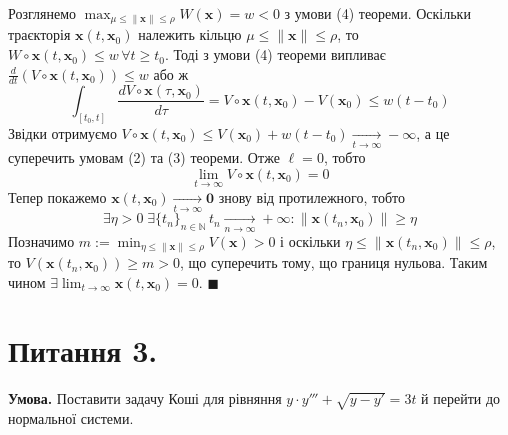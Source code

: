 \documentclass[14pt]{extarticle}
\begin{document}
Розглянемо $\max_{\mu \leq \|\mathbf{x}\| \leq \rho}W(\mathbf{x}) = w < 0$ з умови (4) теореми. Оскільки траєкторія $\mathbf{x}(t,\mathbf{x}_0)$ належить кільцю $\mu \leq \|\mathbf{x}\| \leq \rho$, то $W \circ \mathbf{x}(t,\mathbf{x}_0) \leq w \, \forall t \geq t_0$. Тоді з умови (4) теореми випливає $\frac{d}{dt}\left(V \circ \mathbf{x}(t,\mathbf{x}_0)\right) \leq w$ або ж
\[
\int_{[t_0,t]} \frac{dV \circ \mathbf{x}(\tau,\mathbf{x}_0)}{d\tau} = V \circ \mathbf{x}(t,\mathbf{x}_0)-V(\mathbf{x}_0) \leq w(t-t_0)
\]
Звідки отримуємо $V \circ \mathbf{x}(t,\mathbf{x}_0) \leq V(\mathbf{x}_0) + w(t-t_0) \xrightarrow[t \to \infty]{} -\infty$, а це суперечить умовам (2) та (3) теореми. Отже $\ell=0$, тобто
\[
\lim_{t \to \infty} V \circ \mathbf{x}(t,\mathbf{x}_0) = 0
\]
Тепер покажемо $\mathbf{x}(t,\mathbf{x}_0) \xrightarrow[t \to \infty]{} \mathbf{0}$ знову від протилежного, тобто 
\[
\exists \eta > 0 \; \exists \{t_n\}_{n \in \mathbb{N}} \, t_n \xrightarrow[n \to \infty]{} +\infty: \|\mathbf{x}(t_n,\mathbf{x}_0)\| \geq \eta
\]
Позначимо $m := \min_{\eta \leq \|\mathbf{x}\| \leq \rho}V(\mathbf{x}) > 0$ і оскільки $\eta \leq \|\mathbf{x}(t_n,\mathbf{x}_0)\| \leq \rho$, то $V(\mathbf{x}(t_n,\mathbf{x}_0)) \geq m > 0$, що суперечить тому, що границя нульова. Таким чином $\exists \lim_{t \to \infty}\mathbf{x}(t,\mathbf{x}_0)=0$. $\blacksquare$

\pagebreak

\section*{Питання 3.}

\textbf{Умова.} Поставити задачу Коші для рівняння $y \cdot y''' + \sqrt{y-y'} = 3t$ й перейти до нормальної системи.
\end{document}
